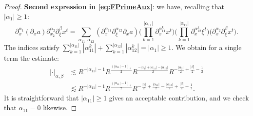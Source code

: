 \documentclass[10pt,a4paper]{amsart}
\begin{document}
\begin{proof}
\textbf{Second expression in \eqref{eq:FPrimeAux}}: we have, recalling that $|\alpha_1| \geq 1$:
\begin{equation*}
    \partial_x^{\alpha_1} (\partial_x a) \partial_{x_2}^{\alpha_2} \partial_{\xi}^{\beta} x^t = \sum_{\alpha_{11},\alpha_{12}} (\partial_{x}^{\alpha_{11}} \partial_{\xi}^{\alpha_{12}} \partial_x a) \big( \prod_{k=1}^{|\alpha_{11}|} \partial_{x}^{\alpha_{11}^k} x^t \big) \big( \prod_{k=1}^{|\alpha_{12}|} \partial_x^{\alpha_{12}^k} \xi^t \big) \big( \partial_x^{\alpha_2} \partial_{\xi}^{\beta} x^t \big).
\end{equation*}
The indices satisfy $\sum_{k=1}^{|\alpha_{11}|} |\alpha_{11}^k| + \sum_{k=1}^{|\alpha_{12}|} |\alpha_{12}^k| = |\alpha_1| \geq 1$. 
We obtain for a single term the estimate:
\begin{equation*}
\begin{split}
 |\cdot|_{\alpha,\beta} &\lesssim R^{-|\alpha_{11}|-1} R^{\frac{(|\alpha_{11}|-1)_+}{2}} R^{\frac{-|\alpha_1|+|\alpha_{11}|-|\alpha_{12}|}{2}} R^{-\frac{|\alpha_2|}{2}+\frac{|\beta|}{2}-\frac{1}{2}} \\
 &\lesssim R^{-|\alpha_{11}|-1} R^{\frac{(|\alpha_{11}|-1)_+}{2}} R^{-\frac{|\alpha|}{2}+\frac{|\alpha_{11}|}{2}-\frac{|\alpha_{12}|}{2}+\frac{|\beta|}{2}-\frac{1}{2}}.
 \end{split}
\end{equation*}
It is straightforward that $|\alpha_{11}| \geq 1$ gives an acceptable contribution, and we check that $\alpha_{11} = 0$ likewise.


\end{proof}
\end{document}
